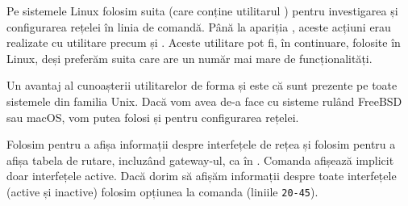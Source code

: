 Pe sistemele Linux folosim suita  (care conține utilitarul ) pentru investigarea și configurarea rețelei în linia de comandă.
Până la apariția , aceste acțiuni erau realizate cu utilitare precum  și .
Aceste utilitare pot fi, în continuare, folosite în Linux, deși preferăm suita  care are un număr mai mare de funcționalități.

Un avantaj al cunoașterii utilitarelor de forma  și  este că sunt prezente pe toate sistemele din familia Unix.
Dacă vom avea de-a face cu sisteme rulând FreeBSD sau macOS, vom putea folosi  și  pentru configurarea rețelei.

Folosim  pentru a afișa informații despre interfețele de rețea și folosim  pentru a afișa tabela de rutare, incluzând gateway-ul, ca în .
Comanda  afișează implicit doar interfețele active.
Dacă dorim să afișăm informații despre toate interfețele (active și inactive) folosim opțiunea  la comanda  (liniile \texttt{20-45}).

